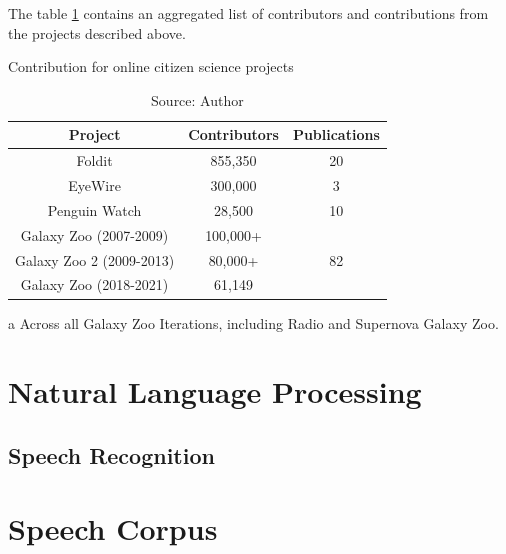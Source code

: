 The table \ref{tab:cs-contributions} contains an aggregated list of contributors and contributions from the projects described above.

\begin{table}[h]
\centering
\begin{threeparttable}
    \caption{Contribution for online citizen science projects}
    \small{
    \begin{tabular}{|c|c|c|}
        \hline 
        Project & Contributors & Publications \\ \hline
        Foldit & 855,350 \cite{foldit2021players} & 20 \cite{foldit2021publications} \\ \hline
        EyeWire & 300,000 \cite{eyewire2017players} & 3 \cite{eyewire2021publications} \\ \hline
        Penguin Watch & 28,500 \cite{penguin2021players} & 10 \cite{penguin2021publications} \\ \hline
        Galaxy Zoo (2007-2009) & 100,000+ \cite{lintott2011galaxy} & \multirow{3}{*}{82 \cite{galaxyzoo2021publications}\tnote{~a}} \\ \cline{1-2} 
        Galaxy Zoo 2 (2009-2013) & 80,000+ \cite{galaxyzoo22021volunteers} & \\ \cline{1-2} 
        Galaxy Zoo (2018-2021) & 61,149 \cite{galaxyzoo2021players} & \\ \hline 
    \end{tabular}}
    \begin{tablenotes}
        \item[a] Across all Galaxy Zoo Iterations, including Radio and Supernova Galaxy Zoo.
    \end{tablenotes}
\end{threeparttable}
\caption*{Source: Author}
\label{tab:cs-contributions}
\end{table}

\section{Natural Language Processing}

\subsection{Speech Recognition}

\section{Speech Corpus}

